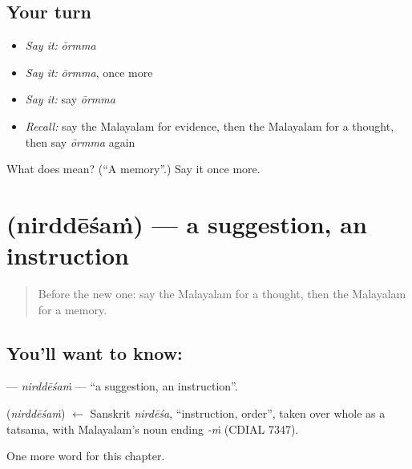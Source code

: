 \subsection*{Your turn}
\begin{itemize}
\raggedright
  \item \emph{Say it:} \emph{ōrmma}
  \item \emph{Say it:} \emph{ōrmma}, once more
  \item \emph{Say it:} say \emph{ōrmma}
  \item \emph{Recall:} say the Malayalam for evidence, then the Malayalam for a thought, then say \emph{ōrmma} again
\end{itemize}

\begin{tcolorbox}[breakable,colback=teal!4,colframe=teal!35!black,title={Before you move on}]
What does  mean? (\textquotedblleft{}A memory\textquotedblright{}.) Say it once more.
\end{tcolorbox}
\section[\texorpdfstring{\ml{നിർദ്ദേശം} (nirddēśaṁ)}{നിർദ്ദേശം (nirddēśaṁ)}]{ (nirddēśaṁ) — a suggestion, an instruction}

\label{lesson:ML-C318-nirddesam}



\begin{quote}
Before the new one: say the Malayalam for a thought, then the Malayalam for a memory.
\end{quote}

\subsection*{You'll want to know: }
\textbf{} — \emph{nirddēśaṁ} — \textquotedblleft{}a suggestion, an instruction\textquotedblright{}.

\begin{cousinweb}
\textbf{} (\emph{nirddēśaṁ}) $\leftarrow$ Sanskrit \emph{nirdēśa}, \textquotedblleft{}instruction, order\textquotedblright{}, taken over whole as a tatsama, with Malayalam's noun ending \emph{-ṁ} (CDIAL 7347).
\end{cousinweb}

\begin{grammarlens}[title={What you've built}]
One more word for this chapter.
\end{grammarlens}

